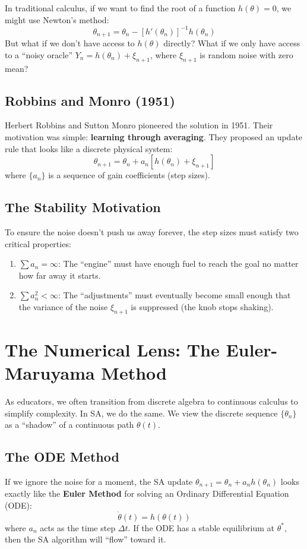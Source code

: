 \documentclass[11pt]{article}
\begin{document}
In traditional calculus, if we want to find the root of a function $h(\theta) = 0$, we might use Newton's method:
\begin{equation}
    \theta_{n+1} = \theta_n - [h'(\theta_n)]^{-1} h(\theta_n)
\end{equation}
But what if we don't have access to $h(\theta)$ directly? What if we only have access to a ``noisy oracle'' $Y_n = h(\theta_n) + \xi_{n+1}$, where $\xi_{n+1}$ is random noise with zero mean?

\subsection{Robbins and Monro (1951)}
Herbert Robbins and Sutton Monro pioneered the solution in 1951. Their motivation was simple: \textbf{learning through averaging}. They proposed an update rule that looks like a discrete physical system:
\begin{equation}
    \theta_{n+1} = \theta_n + a_n \left[ h(\theta_n) + \xi_{n+1} \right]
\end{equation}
where $\{a_n\}$ is a sequence of gain coefficients (step sizes). 

\subsection{The Stability Motivation}
To ensure the noise doesn't push us away forever, the step sizes must satisfy two critical properties:
\begin{enumerate}
    \item $\sum a_n = \infty$: The ``engine'' must have enough fuel to reach the goal no matter how far away it starts.
    \item $\sum a_n^2 < \infty$: The ``adjustments'' must eventually become small enough that the variance of the noise $\xi_{n+1}$ is suppressed (the knob stops shaking).
\end{enumerate}

\section{The Numerical Lens: The Euler-Maruyama Method}

As educators, we often transition from discrete algebra to continuous calculus to simplify complexity. In SA, we do the same. We view the discrete sequence $\{\theta_n\}$ as a ``shadow'' of a continuous path $\theta(t)$.

\subsection{The ODE Method}
If we ignore the noise for a moment, the SA update $\theta_{n+1} = \theta_n + a_n h(\theta_n)$ looks exactly like the \textbf{Euler Method} for solving an Ordinary Differential Equation (ODE):
\begin{equation}
    \dot{\theta}(t) = h(\theta(t))
\end{equation}
where $a_n$ acts as the time step $\Delta t$. If the ODE has a stable equilibrium at $\theta^*$, then the SA algorithm will ``flow'' toward it.
\end{document}
